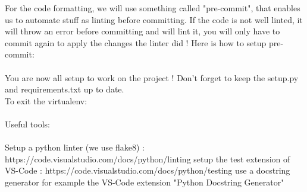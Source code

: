 \documentclass[12pt]{article}
\begin{document}
For the code formatting, we will use something called "pre-commit", that enables us to automate stuff as linting before committing. If the code is not well linted, it will throw an error before committing and will lint it, you will only have to commit again to apply the changes the linter did ! Here is how to setup pre-commit:\\


\noindent{}\\

You are now all setup to work on the project ! Don't forget to keep the setup.py and requirements.txt up to date.\\

To exit the virtualenv:\\

\noindent{}\\

Useful tools:
\\\\
Setup a python linter (we use flake8) : https://code.visualstudio.com/docs/python/linting
setup the test extension of VS-Code : https://code.visualstudio.com/docs/python/testing
use a docstring generator for example the VS-Code extension "Python Docstring Generator"
\end{document}
